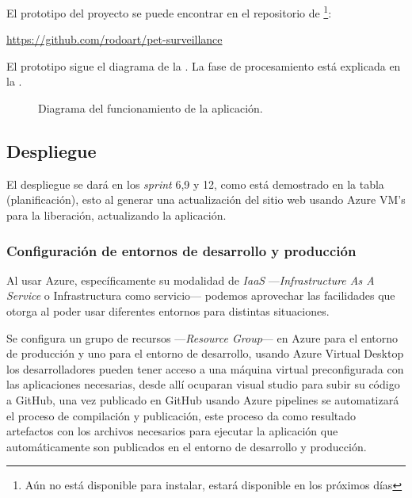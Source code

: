 El prototipo del proyecto se puede encontrar en el repositorio de \footnote{Aún no está disponible para instalar, estará disponible en los próximos días}:

\begin{quotebox}
    \href{https://github.com/rodoart/pet-surveillance}{https://github.com/rodoart/pet-surveillance}
\end{quotebox}    

El prototipo sigue el diagrama de la . La fase de procesamiento está explicada en la .

\begin{figure}
    \centering
    \caption[Diagrama del funcionamiento de la aplicación.]{Diagrama del funcionamiento de la aplicación.}
    \label{fig:funcionamiento}
    
\end{figure}


\subsection{Despliegue}

El despliegue se dará en los \textit{sprint} 6,9 y 12, como está demostrado en la tabla (planificación), esto al generar una actualización del sitio web usando Azure VM's para la liberación, actualizando la aplicación. 

\subsubsection{Configuración de entornos de desarrollo y producción}

Al usar Azure, específicamente su modalidad de \textit{IaaS} —\textit{Infrastructure As A Service} o Infrastructura como servicio— podemos aprovechar las facilidades que otorga al poder usar diferentes entornos para distintas situaciones. 

Se configura un grupo de recursos —\textit{Resource Group}— en Azure para el entorno de producción y uno para el entorno de desarrollo, usando Azure Virtual Desktop los desarrolladores pueden tener acceso a una máquina virtual preconfigurada con las aplicaciones necesarias, desde allí ocuparan visual studio para subir su código a GitHub, una vez publicado en GitHub usando Azure pipelines se automatizará el proceso de compilación y publicación, este proceso da como resultado artefactos con los archivos necesarios para ejecutar la aplicación que automáticamente son publicados en el entorno de desarrollo y producción.

